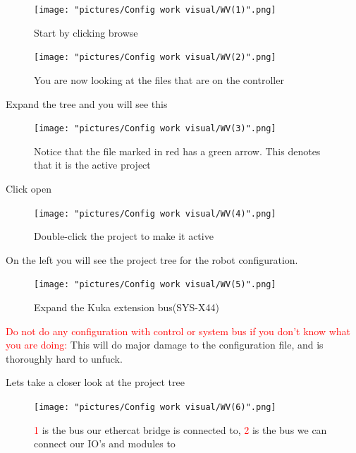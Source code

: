 \documentclass{article}
\begin{document}
\begin{figure}[!h]
    \centering
    \texttt{[image: "pictures/Config work visual/WV(1)".png]}
    \caption{Start by clicking browse}
   
\end{figure}

\newpage

\begin{figure}[!h]
    \centering
    \texttt{[image: "pictures/Config work visual/WV(2)".png]}
    \caption{You are now looking at the files that are on the controller}
   
\end{figure}

Expand the tree and you will see this

\begin{figure}[!h]
    \centering
    \texttt{[image: "pictures/Config work visual/WV(3)".png]}
    \caption{Notice that the file marked in red has a green arrow. This denotes that it is the active project}
    
\end{figure}

Click open

\begin{figure}[!h]
    \centering
    \texttt{[image: "pictures/Config work visual/WV(4)".png]}
    \caption{Double-click the project to make it active}
   
\end{figure}

\newpage

On the left you will see the project tree for the robot configuration. 

\begin{figure}[!h]
    \centering
    \texttt{[image: "pictures/Config work visual/WV(5)".png]}
    \caption{Expand the Kuka extension bus(SYS-X44)}
    
\end{figure}



\textcolor{red}{Do not do any configuration with control or system bus if you don't know what you are doing:} This will do major damage to the configuration file, and is thoroughly hard to unfuck. 

\newpage

Lets take a closer look at the project tree

\begin{figure}[!h]
    \centering
    \texttt{[image: "pictures/Config work visual/WV(6)".png]}
    \caption{\textcolor{red}{1} is the bus our ethercat bridge is connected to, \textcolor{red}{2} is the bus we can connect our IO's and modules to}
  
\end{figure}
\end{document}
